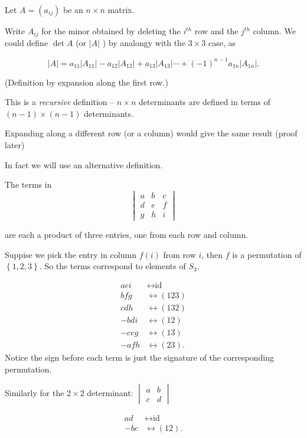 \documentclass{article}
\theoremstyle{definition} \newtheorem*{definition}{Definition}
\begin{document}
Let $A=(a_{ij})$  be an $n \times n$ matrix.

Write $A_{ij}$ for the minor obtained by deleting the $i^{th}$ row and the
$j^{th}$ column. We could define $\det A$ (or $|A|$ ) by analongy with the $3
\times 3$ case, as

\[ |A| = a_{11}|A_{11}| - a_{12}|A_{12}| + a_{13}|A_{13}| \cdots +
(-1)^{n-1}a_{1n}|A_{1n}|.  \]

(Definition by expansion along the first row.)

This is a \emph{recursive} definition -- $n \times n$ determinants are defined
in terms of $(n-1) \times (n-1)$ determinants.

Expanding along a different row (or a column) would give the same result (proof
later)


In fact we will use an alternative definition.

The terms in \[ \begin{vmatrix} a & b & c \\ d & e & f \\ g & h & i
\end{vmatrix} \]

are each a product of three entries, one from each row and column.

Suppise we pick the entry in column $f(i)$ from row $i$, then $f$ is a
permutation of $\left\{ 1,2,3 \right\}$. So the terms correspond to elements of
$S_3$.

\begin{align*} aei &\leftrightarrow \text{id} \\ bfg &\leftrightarrow (123) \\
  cdh &\leftrightarrow (132) \\ -bdi &\leftrightarrow (12) \\ -ceg
  &\leftrightarrow (13) \\ -afh &\leftrightarrow (23).  \end{align*} Notice the
sign before each term is just the signature of the corresponding permutation.

Similarly for the $2 \times 2$ determinant: $\begin{vmatrix}a & b \\ c &
  d\end{vmatrix}$

\begin{align*} ad &\leftrightarrow \text{id} \\ -bc &\leftrightarrow (12).
\end{align*}
\end{document}
